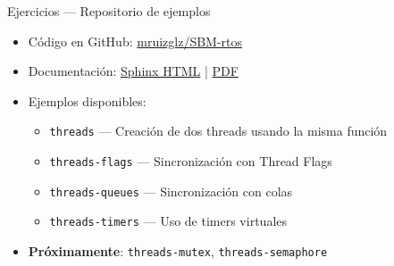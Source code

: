 \begin{frame}{Ejercicios — Repositorio de ejemplos}
    \begin{itemize}
        \item Código en GitHub:
              \href{https://github.com/mruizglz/SBM-rtos}{mruizglz/SBM-rtos}
        \item Documentación:
              \href{https://mruizglz.github.io/SBM-rtos}{Sphinx HTML} |
              \href{https://mruizglz.github.io/SBM-rtos/simplepdf/SBM-CMSIS-RTOS-V2.pdf}{PDF}
        \item Ejemplos disponibles:
            \begin{itemize}
                \item \texttt{threads} — Creación de dos threads usando la
                      misma función
                \item \texttt{threads-flags} — Sincronización con Thread Flags
                \item \texttt{threads-queues} — Sincronización con colas
                \item \texttt{threads-timers} — Uso de timers virtuales
            \end{itemize}
        \item \textbf{Próximamente}: \texttt{threads-mutex},
              \texttt{threads-semaphore}
    \end{itemize}
\end{frame}

